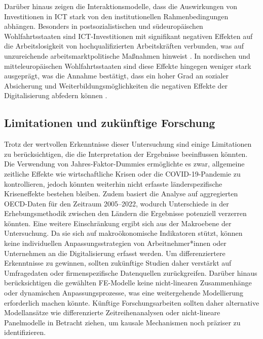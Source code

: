 Darüber hinaus zeigen die Interaktionsmodelle, dass die Auswirkungen von 
Investitionen in \ac{ICT }stark von den institutionellen Rahmenbedingungen abhängen. 
Besonders in postsozialistischen und südeuropäischen Wohlfahrtsstaaten sind 
\ac{ICT}-Investitionen mit signifikant negativen Effekten auf die Arbeitslosigkeit von 
hochqualifizierten Arbeitskräften verbunden, was auf unzureichende arbeitsmarktpolitische 
Maßnahmen hinweist \parencite[S. 3ff]{hall2001varieties}. In nordischen und 
mitteleuropäischen Wohlfahrtsstaaten sind diese Effekte hingegen weniger stark 
ausgeprägt, was die Annahme bestätigt, dass ein hoher Grad an sozialer Absicherung und 
Weiterbildungsmöglichkeiten die negativen Effekte der Digitalisierung abfedern können 
\parencite[S. 27ff]{espingandersen1990thethree}.

\subsection{Limitationen und zukünftige Forschung}

Trotz der wertvollen Erkenntnisse dieser Untersuchung sind einige Limitationen zu 
berücksichtigen, die die Interpretation der Ergebnisse beeinflussen könnten. Die 
Verwendung von Jahres-Faktor-Dummies ermöglichte es zwar, allgemeine zeitliche 
Effekte wie wirtschaftliche Krisen oder die COVID-19-Pandemie zu kontrollieren, 
jedoch könnten weiterhin nicht erfasste länderspezifische Kriseneffekte bestehen 
bleiben. Zudem basiert die Analyse auf aggregierten \ac{OECD}-Daten für den 
Zeitraum 2005–2022, wodurch Unterschiede in der Erhebungsmethodik zwischen den 
Ländern die Ergebnisse potenziell verzerren könnten. Eine weitere Einschränkung 
ergibt sich aus der Makroebene der Untersuchung. Da sie sich auf makroökonomische 
Indikatoren stützt, können keine individuellen Anpassungsstrategien von 
Arbeitnehmer*innen oder Unternehmen an die Digitalisierung erfasst werden. 
Um differenziertere Erkenntnisse zu gewinnen, sollten zukünftige Studien daher 
verstärkt auf Umfragedaten oder firmenspezifische Datenquellen zurückgreifen. 
Darüber hinaus berücksichtigen die gewählten \ac{FE}-Modelle keine nicht-linearen 
Zusammenhänge oder dynamischen Anpassungsprozesse, was eine weitergehende 
Modellierung erforderlich machen könnte. Künftige Forschungsarbeiten sollten 
daher alternative Modellansätze wie differenzierte Zeitreihenanalysen oder 
nicht-lineare Panelmodelle in Betracht ziehen, um kausale Mechanismen noch 
präziser zu identifizieren.

